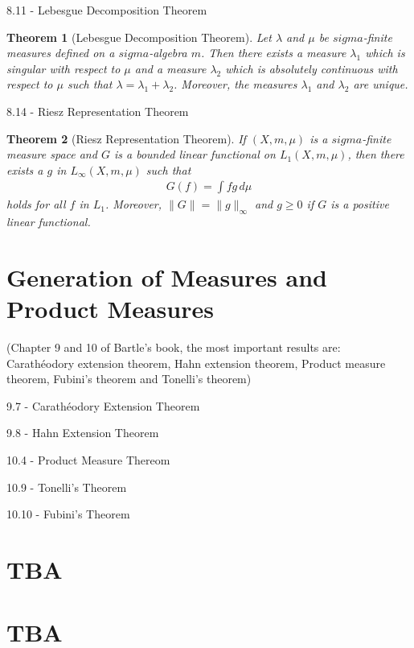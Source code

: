 \documentclass{article}
\newtheorem{theorem}{Theorem}[section]
\numberwithin{equation}{section}
\begin{document}
8.11 - Lebesgue Decomposition Theorem

\begin{theorem}[Lebesgue Decomposition Theorem]
    Let $\lambda$ and $\mu$ be $sigma$-finite measures defined on a $sigma$-algebra $m$.
    Then there exists a measure $\lambda_1$ which is singular with respect to $\mu$ and a measure $\lambda_2$ which is absolutely continuous with respect to $\mu$ such that $\lambda = \lambda_1 + \lambda_2$.
    Moreover, the measures $\lambda_1$ and $\lambda_2$ are unique.
\end{theorem}

8.14 - Riesz Representation Theorem

\begin{theorem}[Riesz Representation Theorem]
    If $(X, m, \mu)$ is a $sigma$-finite measure space and $G$ is a bounded linear functional on $L_1(X, m, \mu)$, then there exists a $g$ in $L_\infty(X, m, \mu)$ such that
    \begin{align}\label{eq:b8.10}
        G(f) = \int fg \, d\mu
    \end{align}
    holds for all $f$ in $L_1$.
    Moreover, $\|G\| = \|g\|_\infty$ and $g \geq 0$ if $G$ is a positive linear functional. 
\end{theorem}

\newpage

\section{Generation of Measures and Product Measures}

(Chapter 9 and 10 of Bartle's book, the most important results are: Carathéodory extension theorem, Hahn extension theorem, Product measure theorem, Fubini's theorem and Tonelli's theorem)

9.7 - Carathéodory Extension Theorem

9.8 - Hahn Extension Theorem

10.4 - Product Measure Thereom

10.9 - Tonelli's Theorem

10.10 - Fubini's Theorem

\newpage

\section{TBA}

\newpage

\section{TBA}
\end{document}
